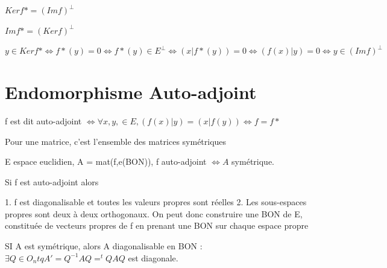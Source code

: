 \documentclass[french]{yLectureNote}
\begin{document}
\begin{proposition}
    $Ker f* =( Im f)^{\perp}$

    $Im f* = (Ker f)^{\perp}$
\end{proposition}
\begin{myproof}
    $y\in Ker f* \iff f*(y) = 0\iff f*(y)\in E^{\perp} \iff (x|f*(y)) = 0 \iff (f(x)|y) = 0\iff y\in (Im f)^{\perp}$
\end{myproof}
\section{Endomorphisme Auto-adjoint}
\begin{definition}
    f est dit auto-adjoint $\iff \forall x,y, \in E , (f(x)|y) = (x|f(y))\iff f=f*$
\end{definition}
Pour une matrice, c'est l'ensemble des matrices symétriques
\begin{proposition}
    E espace euclidien, A = mat(f,e(BON)), f auto-adjoint $\iff A$ symétrique.
\end{proposition}
\begin{theorem}
    Si f est auto-adjoint alors

    1. f est diagonalisable et toutes les valeurs propres sont réelles
    2. Les sous-espaces propres sont deux à deux orthogonaux. On peut donc construire une BON de E, constituée de vecteurs propres de f en prenant une BON sur chaque espace propre

\end{theorem}
\begin{theorem}
    SI A est symétrique, alors A diagonalisable en BON : $\exists Q \in O_n tq A'=Q^{-1}AQ = ^tQAQ$ est diagonale.
\end{theorem}
\end{document}
